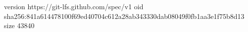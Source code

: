 version https://git-lfs.github.com/spec/v1
oid sha256:841a614478100f69ed40704c612a28ab343330dab08049f0fb1aa3e1f75b8d13
size 43840
